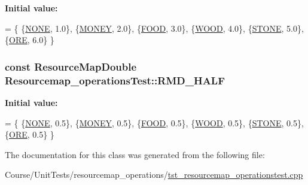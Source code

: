 {\bfseries Initial value\-:}
\begin{DoxyCode}
= \{
        \{\hyperlink{namespaceCourse_a02d49c04029594d4adba79b84bb85f65ae3def61eb1a9033cc0b0d1d2c3c6ff84}{NONE}, 1.0\},
        \{\hyperlink{namespaceCourse_a02d49c04029594d4adba79b84bb85f65aff016add6bbbdbb44abf1d2d7f215ec0}{MONEY}, 2.0\},
        \{\hyperlink{namespaceCourse_a02d49c04029594d4adba79b84bb85f65a7018c47af38bfc1390a89e70b4cf4760}{FOOD}, 3.0\},
        \{\hyperlink{namespaceCourse_a02d49c04029594d4adba79b84bb85f65a87287be3009253b983ffb2e9f91eef22}{WOOD}, 4.0\},
        \{\hyperlink{namespaceCourse_a02d49c04029594d4adba79b84bb85f65a8598c3079c2be7785410e724cc190229}{STONE}, 5.0\},
        \{\hyperlink{namespaceCourse_a02d49c04029594d4adba79b84bb85f65af416a215c7dad21349df38d35be0a1e1}{ORE}, 6.0\}
    \}
\end{DoxyCode}
\hypertarget{classResourcemap__operationsTest_a5dca1aa151e89d700b83a22f192c27ba}{
\subsubsection[{R\-M\-D\-\_\-\-H\-A\-L\-F}]{\setlength{\rightskip}{0pt plus 5cm}const {\bf Resource\-Map\-Double} Resourcemap\-\_\-operations\-Test\-::\-R\-M\-D\-\_\-\-H\-A\-L\-F\hspace{0.3cm}{\ttfamily [private]}}}\label{classResourcemap__operationsTest_a5dca1aa151e89d700b83a22f192c27ba}
{\bfseries Initial value\-:}
\begin{DoxyCode}
= \{
        \{\hyperlink{namespaceCourse_a02d49c04029594d4adba79b84bb85f65ae3def61eb1a9033cc0b0d1d2c3c6ff84}{NONE}, 0.5\},
        \{\hyperlink{namespaceCourse_a02d49c04029594d4adba79b84bb85f65aff016add6bbbdbb44abf1d2d7f215ec0}{MONEY}, 0.5\},
        \{\hyperlink{namespaceCourse_a02d49c04029594d4adba79b84bb85f65a7018c47af38bfc1390a89e70b4cf4760}{FOOD}, 0.5\},
        \{\hyperlink{namespaceCourse_a02d49c04029594d4adba79b84bb85f65a87287be3009253b983ffb2e9f91eef22}{WOOD}, 0.5\},
        \{\hyperlink{namespaceCourse_a02d49c04029594d4adba79b84bb85f65a8598c3079c2be7785410e724cc190229}{STONE}, 0.5\},
        \{\hyperlink{namespaceCourse_a02d49c04029594d4adba79b84bb85f65af416a215c7dad21349df38d35be0a1e1}{ORE}, 0.5\}
    \}
\end{DoxyCode}


The documentation for this class was generated from the following file\-:\begin{DoxyCompactItemize}
\item 
Course/\-Unit\-Tests/resourcemap\-\_\-operations/\hyperlink{tst__resourcemap__operationstest_8cpp}{tst\-\_\-resourcemap\-\_\-operationstest.\-cpp}\end{DoxyCompactItemize}
